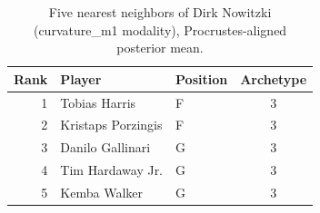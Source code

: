 \begin{table}[htbp]
  \centering\small
  \begin{tabular}{rllc}
    \toprule
    Rank & Player & Position & Archetype \\
    \midrule
    1 & Tobias Harris & F & 3 \\
    2 & Kristaps Porzingis & F & 3 \\
    3 & Danilo Gallinari & G & 3 \\
    4 & Tim Hardaway Jr. & G & 3 \\
    5 & Kemba Walker & G & 3 \\
    \bottomrule
  \end{tabular}
  \caption{Five nearest neighbors of Dirk Nowitzki (curvature_m1 modality), Procrustes-aligned posterior mean.}
  \label{tab:Dirk_Nowitzki_neighbors_curvature_m1}
\end{table}

